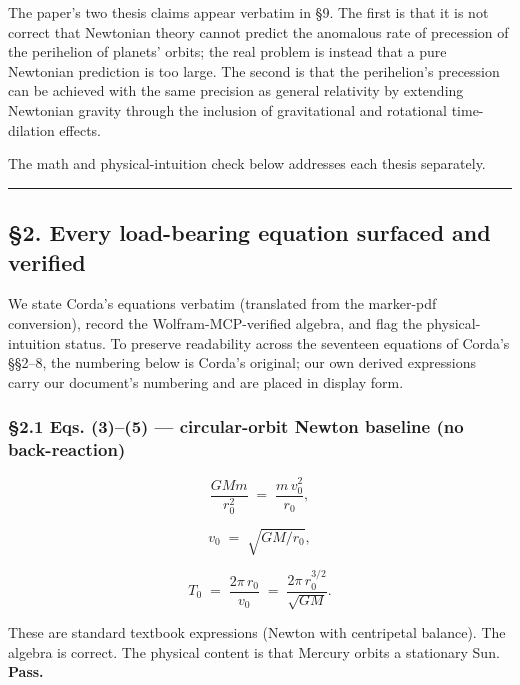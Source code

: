 \documentclass[
  11pt,
]{article}
\begin{document}
The paper's two thesis claims appear verbatim in §9. The first is that
it is not correct that Newtonian theory cannot predict the anomalous
rate of precession of the perihelion of planets' orbits; the real
problem is instead that a pure Newtonian prediction is too large. The
second is that the perihelion's precession can be achieved with the same
precision as general relativity by extending Newtonian gravity through
the inclusion of gravitational and rotational time-dilation effects.

The math and physical-intuition check below addresses each thesis
separately.

\begin{center}\rule{0.5\linewidth}{0.5pt}\end{center}

\hypertarget{every-load-bearing-equation-surfaced-and-verified}{%
\subsection{§2. Every load-bearing equation surfaced and
verified}\label{every-load-bearing-equation-surfaced-and-verified}}

We state Corda's equations verbatim (translated from the marker-pdf
conversion), record the Wolfram-MCP-verified algebra, and flag the
physical-intuition status. To preserve readability across the seventeen
equations of Corda's §§2--8, the numbering below is Corda's original;
our own derived expressions carry our document's numbering and are
placed in display form.

\hypertarget{eqs.-35-circular-orbit-newton-baseline-no-back-reaction}{%
\subsubsection{§2.1 Eqs. (3)--(5) --- circular-orbit Newton baseline (no
back-reaction)}\label{eqs.-35-circular-orbit-newton-baseline-no-back-reaction}}

\[
\frac{G M m}{r_{0}^{2}} \;=\; \frac{m\,v_{0}^{2}}{r_{0}}, \tag{3}
\]

\[
v_{0} \;=\; \sqrt{G M / r_{0}}, \tag{4}
\]

\[
T_{0} \;=\; \frac{2\pi\,r_{0}}{v_{0}} \;=\; \frac{2\pi\,r_{0}^{3/2}}{\sqrt{G M}}. \tag{5}
\]

These are standard textbook expressions (Newton with centripetal
balance). The algebra is correct. The physical content is that Mercury
orbits a stationary Sun. \textbf{Pass.}
\end{document}
